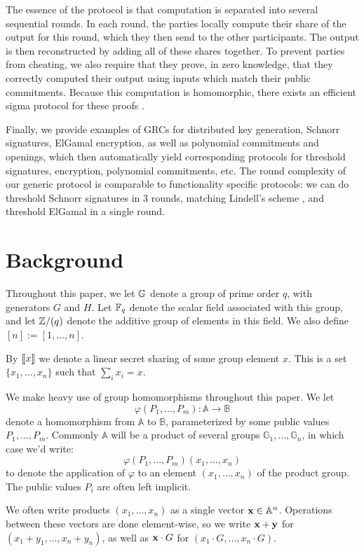 The essence of the protocol is that computation
is separated into several sequential rounds.
In each round, the parties locally compute their share
of the output for this round, which they then send
to the other participants.
The output is then reconstructed by adding all of these
shares together.
To prevent parties from cheating, we also require
that they prove, in zero knowledge, that they correctly computed their output using inputs
which match their public commitments.
Because this computation is homomorphic,
there exists an efficient sigma protocol for
these proofs \cite{maurer_unifying_2009}.

Finally, we provide examples of GRCs for distributed key generation,
Schnorr signatures, ElGamal encryption, as well as polynomial commitments
and openings, which then automatically yield corresponding
protocols for threshold signatures, encryption, polynomial commitments,
etc.
The round complexity of our generic protocol is comparable
to functionality specific protocols: we can do threshold
Schnorr signatures in 3 rounds, matching Lindell's scheme \cite{lindell_simple_2022},
and threshold ElGamal in a single round.

\section{Background}
\label{sec:background}

Throughout this paper, we let $\mathbb{G}$ denote a group of prime order $q$,
with generators $G$ and $H$. Let $\mathbb{F}_q$ denote the scalar field associated
with this group, and let $\mathbb{Z}/(q)$ denote the additive group of elements
in this field. We also define $[n] := [1, \ldots, n]$.

By $\llbracket x\rrbracket$ we denote a linear secret sharing of some group element
$x$. This is a set $\{x_1, \ldots, x_n\}$ such that $\sum_i x_i = x$.

We make heavy use of group homomorphisms throughout this paper.
We let
$$
\varphi(P_1, \ldots, P_m) : \mathbb{A} \to \mathbb{B}
$$
denote a homomorphism from $\mathbb{A}$ to $\mathbb{B}$, parameterized
by some public values $P_1, \ldots, P_m$. Commonly $\mathbb{A}$
will be a product of several groups $\mathbb{G}_1, \ldots, \mathbb{G}_n$,
in which case we'd write:
$$
\varphi(P_1, \ldots, P_m)(x_1, \ldots, x_n)
$$
to denote the application of $\varphi$ to an element $(x_1, \ldots, x_n)$
of the product group. The public values $P_i$ are often left implicit.

We often write products $(x_1, \ldots, x_n)$ as a single vector
$\textbf{x} \in \mathbb{A}^n$. Operations between these vectors
are done element-wise, so we write $\textbf{x} + \textbf{y}$ for ${(x_1 + y_1, \ldots, x_n + y_n)}$,
as well as $\textbf{x} \cdot G$ for $(x_1 \cdot G, \ldots, x_n \cdot G)$.

